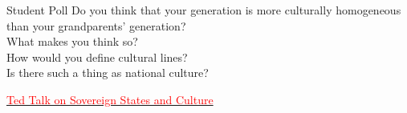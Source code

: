 \documentclass{beamer}
\begin{document}
\begin{frame}{Student Poll}
\large
   Do you think that your generation is more culturally homogeneous than your grandparents' generation? \\ What makes you think so? \\ How would you define cultural lines? \\ Is there such a thing as national culture? \pause \vspace{1cm}\\
   \begin{center}
       \href{https://www.youtube.com/watch?v=LYCKzpXEW6E}{\textcolor{red}{Ted Talk on Sovereign States and Culture}}
   \end{center}
\end{frame}
\end{document}
